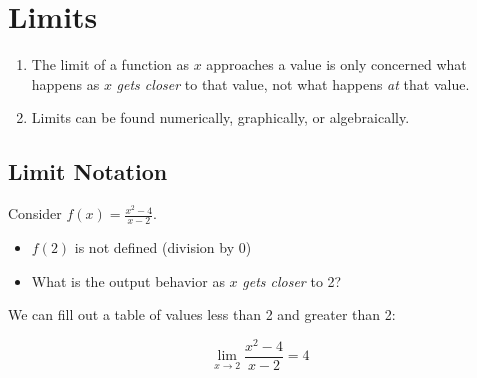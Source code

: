 \documentclass{article}
\begin{document}
\section*{Limits}

\begin{tcolorbox}[colframe=orange!70!white, coltitle=black, title=\textbf{Summary}]
\begin{enumerate}
    \item The limit of a function as $x$ approaches a value is only concerned what happens as $x$ \emph{gets closer} to that value, not what happens \emph{at} that value.
    \item Limits can be found numerically, graphically, or algebraically.
\end{enumerate}
\end{tcolorbox}
\vspace{1in}

\subsection*{Limit Notation}

Consider $f(x) = \frac{x^2-4}{x-2}$. 
\begin{itemize}
    \item $f(2)$ is not defined (division by 0)
    \item What is the output behavior as $x$ \emph{gets closer} to 2?
\end{itemize}

We can fill out a table of values less than 2 and greater than 2:

\vfill 

\[
\lim_{x \to 2} \frac{x^2-4}{x-2} = 4
\]

\vspace{1in}

\newpage 

    


    
\end{document}
